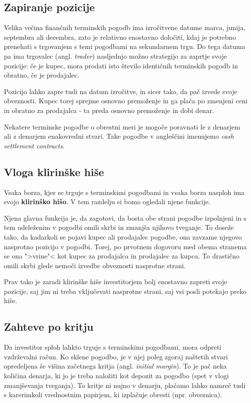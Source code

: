 \documentclass[a4paper, 12pt]{article}
\begin{document}
\subsection{Zapiranje pozicije}
Velika večina finančnih terminskih pogodb ima izročitvene datume marca, junija, septembra ali 
decembra, zato je relativno enostavno določiti, kdaj je potrebno prenehati s trgovanjem s temi 
pogodbami na sekundarnem trgu. Do tega datuma pa ima trgovalec (angl. \textit{trader}) nasljednjo
možno strategijo za zaprtje svoje pozicije: če je kupec, mora prodati isto število identičnih
terminskih pogodb in obratno, če je prodajalec.

Pozicijo lahko zapre tudi na datum izročitve, in sicer tako, da pač izvede svoje obveznosti. 
Kupec torej sprejme osnovno premoženje in ga plača po zmenjeni ceni in obratno za prodajalca - 
ta preda osnovno premoženje in dobi denar. 

Nekatere terminske pogodbe o obrestni meri je mogoče poravnati le z denarjem ali z denarjem 
enakovredni stvari. Take pogodbe v angleščini imenujemo \textit{cash settlement contracts}.

\subsection{Vloga klirinške hiše}
Vsaka borza, kjer se trguje s terminskimi pogodbami in vsaka borza nasploh ima svojo \textbf{
klirinško hišo}. V tem razdelju si bomo ogledali njene funkcije.

Njena glavna funkcija je, da zagotovi, da bosta obe strani pogodbe izpolnjeni in s tem 
udeleženim v pogodbi omili skrbi in zmanjša njihovo tveganje. To doseže tako, da kadarkoli
se pojavi kupec ali prodajalec pogodbe, ona zavzame njegovo nasprotno pozicijo v pogodbi.
Torej, po prvotnem dogovoru med obema stranema se ona ">vrine"< kot kupec za prodajalca in 
prodajalec za kupca. To drastično omili skrbi glede nemoči izvedbe obveznosti nasprotne
strani. 

Prav tako je zaradi klirinške hiše investitorjem bolj enostavno zapreti svoje pozicije, saj 
jim ni treba vključevati nasprotne strani, saj vsi posli potekajo preko hiše. 

\subsection{Zahteve po kritju}
Da investitor sploh lahkto trguje s terminskimi pogodbami, mora odpreti vzdrževalni račun. 
Ko sklene pogodbo, je v njej poleg zgoraj naštetih stvari opredeljena še višina začetnega 
kritja (angl. \textit{initial margin}). To je pač neka količina denarja, ki jo je treba 
naložiti kot depozit za pogodbo (spet v vlogi zmanjševanja tveganja). To kritje ni nujno
v denarju, plačamo lahko namreč tudi s karerimkoli vrednostnim papirjem, ki izplačuje obresti
(npr. obveznica).
\end{document}
